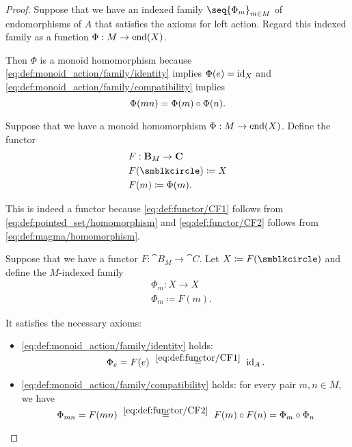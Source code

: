 \begin{proof}
   Suppose that we have an indexed family \( \seq{ \Phi_m }_{m \in M} \) of endomorphisms of \( A \) that satisfies the axioms for left action. Regard this indexed family as a function \( \Phi: M \to \operatorname{end}(X) \).

  Then \( \Phi \) is a monoid homomorphism because \ref{eq:def:monoid_action/family/identity} implies \( \Phi(e) = \operatorname{id}_X \) and \eqref{eq:def:monoid_action/family/compatibility} implies
  \begin{equation*}
    \Phi(mn) = \Phi(m) \bincirc \Phi(n).
  \end{equation*}

   Suppose that we have a monoid homomorphism \( \Phi: M \to \operatorname{end}(X) \). Define the functor
  \begin{equation*}
    \begin{aligned}
      &F: \cat{B}_M \to \cat{C} \\
      &F(\anon) \coloneqq X \\
      &F(m) \coloneqq \Phi(m).
    \end{aligned}
  \end{equation*}

  This is indeed a functor because \eqref{eq:def:functor/CF1} follows from \eqref{eq:def:pointed_set/homomorphism} and \eqref{eq:def:functor/CF2} follows from \eqref{eq:def:magma/homomorphism}.

   Suppose that we have a functor \( F: \cat{B}_M \to \cat{C} \). Let \( X \coloneqq F(\anon) \) and define the \( M \)-indexed family
  \begin{equation*}
    \begin{aligned}
      &\Phi_m: X \to X \\
      &\Phi_m \coloneqq F(m).
    \end{aligned}
  \end{equation*}

  It satisfies the necessary axioms:
  \begin{itemize}
    \item \ref{eq:def:monoid_action/family/identity} holds:
    \begin{equation*}
      \Phi_e
      =
      F(e)
      \reloset {\eqref{eq:def:functor/CF1}} =
      \id_A.
    \end{equation*}

    \item \ref{eq:def:monoid_action/family/compatibility} holds: for every pair \( m, n \in M \), we have
    \begin{equation*}
      \Phi_{mn}
      =
      F(mn)
      \reloset {\eqref{eq:def:functor/CF2}} =
      F(m) \bincirc F(n)
      =
      \Phi_m \bincirc \Phi_n
    \end{equation*}
  \end{itemize}
\end{proof}

